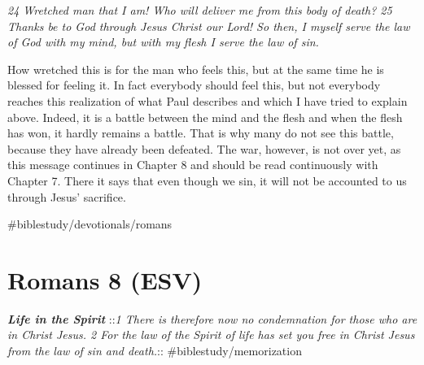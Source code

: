 \emph{24 Wretched man that I am! Who will deliver me from this body of
death? 25 Thanks be to God through Jesus Christ our Lord! So then, I
myself serve the law of God with my mind, but with my flesh I serve the
law of sin.}

How wretched this is for the man who feels this, but at the same time he
is blessed for feeling it. In fact everybody should feel this, but not
everybody reaches this realization of what Paul describes and which I
have tried to explain above. Indeed, it is a battle between the mind and
the flesh and when the flesh has won, it hardly remains a battle. That
is why many do not see this battle, because they have already been
defeated. The war, however, is not over yet, as this message continues
in Chapter 8 and should be read continuously with Chapter 7. There it
says that even though we sin, it will not be accounted to us through
Jesus' sacrifice.

\#biblestudy/devotionals/romans

\hypertarget{romans-8-esv}{%
\section{Romans 8 (ESV)}\label{romans-8-esv}}

\textbf{\emph{Life in the Spirit}} ::\emph{1 There is therefore now no
condemnation for those who are in Christ Jesus. 2 For the law of the
Spirit of life has set you free in Christ Jesus from the law of sin and
death.}:: \#biblestudy/memorization

